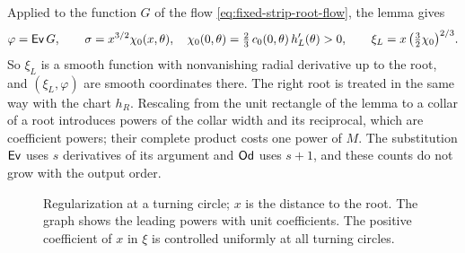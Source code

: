 Applied to the function $G$ of the flow
\eqref{eq:fixed-strip-root-flow}, the lemma gives
\[
 \varphi=\mathsf{Ev}\,G,\qquad
 \sigma=x^{3/2}\chi_0(x,\theta),\quad
 \chi_0(0,\theta)=\tfrac23\,c_0(0,\theta)\,h_L'(\theta)>0,\qquad
 \xi_L=x\,\bigl(\tfrac32\chi_0\bigr)^{2/3} .
\]
So $\xi_L$ is a smooth function with nonvanishing radial derivative
up to the root, and $(\xi_L,\varphi)$ are smooth coordinates there.
The right root is treated in the same way with the chart $h_R$.
Rescaling from the unit rectangle of the lemma to a collar of a root
introduces powers of the collar width and its reciprocal, which are
coefficient powers; their complete product costs one power of $M$.
The substitution $\mathsf{Ev}$ uses $s$ derivatives of its argument and
$\mathsf{Od}$ uses $s+1$, and these counts do not grow with the output order.

\begin{figure}[htbp]
\centering
{}
\caption{Regularization at a turning circle; $x$ is the distance to
the root. The graph shows the leading powers with unit coefficients.
The positive coefficient of $x$ in $\xi$ is controlled uniformly at
all turning circles.}
\label{fig:root-regularization}
\end{figure}

